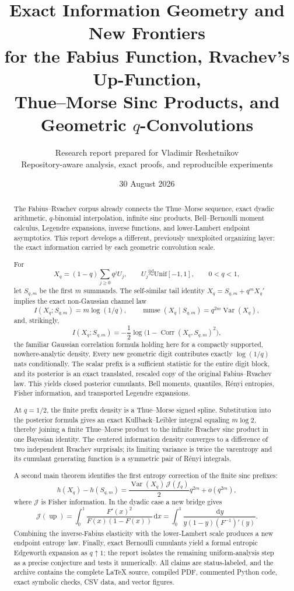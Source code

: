 \documentclass[11pt,oneside]{article}
\title{\bfseries Exact Information Geometry and New Frontiers\\[0.35em]
\Large for the Fabius Function, Rvachev's Up-Function,\\
Thue--Morse Sinc Products, and Geometric $q$-Convolutions}
\author{Research report prepared for Vladimir Reshetnikov\\
\small Repository-aware analysis, exact proofs, and reproducible experiments}
\date{30 August 2026}
\theoremstyle{definition}
\theoremstyle{remark}
\newcommand{\Corr}{\operatorname{Corr}}
\newcommand{\Up}{\operatorname{up}}
\newcommand{\dd}{\,\mathrm d}
\begin{document}
\maketitle

\begin{abstract}
The Fabius--Rvachev corpus already connects the Thue--Morse sequence, exact dyadic
arithmetic, $q$-binomial interpolation, infinite sinc products, Bell--Bernoulli
moment calculus, Legendre expansions, inverse functions, and lower-Lambert
endpoint asymptotics.  This report develops a different, previously unexploited
organizing layer: the exact information carried by each geometric convolution
scale.

For
\[
 X_q=(1-q)\sum_{j\ge0}q^jU_j,
 \qquad U_j\stackrel{\mathrm{iid}}\sim\mathrm{Unif}[-1,1],
 \qquad 0<q<1,
\]
let $S_{q,m}$ be the first $m$ summands.  The self-similar tail identity
$X_q=S_{q,m}+q^mX_q'$ implies the exact non-Gaussian channel law
\[
 I(X_q;S_{q,m})=m\log(1/q),
 \qquad
 \operatorname{mmse}(X_q\mid S_{q,m})=q^{2m}\operatorname{Var}(X_q),
\]
and, strikingly,
\[
 I(X_q;S_{q,m})=-\frac12\log\!\bigl(1-\Corr(X_q,S_{q,m})^2\bigr),
\]
the familiar Gaussian correlation formula holding here for a compactly supported,
nowhere-analytic density.  Every new geometric digit contributes exactly
$\log(1/q)$ nats conditionally.  The scalar prefix is a sufficient statistic for
the entire digit block, and its posterior is an exact translated, rescaled copy of
the original Fabius--Rvachev law.  This yields closed posterior cumulants, Bell
moments, quantiles, R\'enyi entropies, Fisher information, and transported
Legendre expansions.

At $q=1/2$, the finite prefix density is a Thue--Morse signed spline.  Substitution
into the posterior formula gives an exact Kullback--Leibler integral equaling
$m\log2$, thereby joining a finite Thue--Morse product to the infinite Rvachev
sinc product in one Bayesian identity.  The centered information density converges
to a difference of two independent Rvachev surprisals; its limiting variance is
twice the varentropy and its cumulant generating function is a symmetric pair of
R\'enyi integrals.

A second main theorem identifies the first entropy correction of the finite sinc
prefixes:
\[
 h(X_q)-h(S_{q,m})
 =\frac{\operatorname{Var}(X_q)\,\mathcal J(f_q)}2q^{2m}
  +o(q^{2m}),
\]
where $\mathcal J$ is Fisher information.  In the dyadic case a new bridge gives
\[
 \mathcal J(\Up)
 =\int_0^1\frac{F'(x)^2}{F(x)(1-F(x))}\dd x
 =\int_0^1\frac{\dd y}{y(1-y)(F^{-1})'(y)}.
\]
Combining the inverse-Fabius elasticity with the lower-Lambert scale produces a
new endpoint entropy law.  Finally, exact Bernoulli cumulants yield a formal
entropic Edgeworth expansion as $q\uparrow1$; the report isolates the remaining
uniform-analysis step as a precise conjecture and tests it numerically.  All
claims are status-labeled, and the archive contains the complete LaTeX source,
compiled PDF, commented Python code, exact symbolic checks, CSV data, and vector
figures.
\end{abstract}
\end{document}
